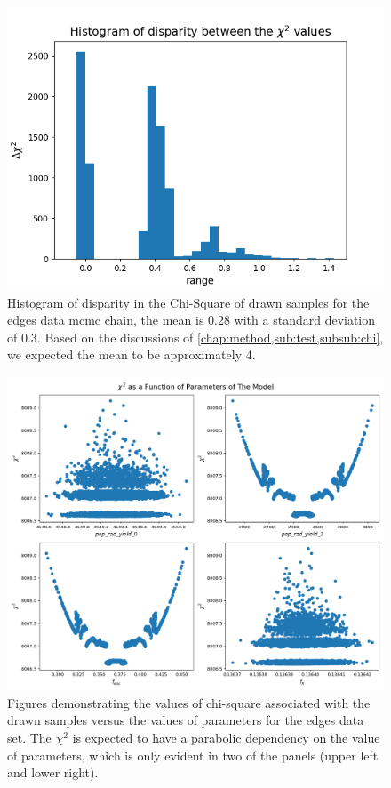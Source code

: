\documentclass[12pt, TexShade, letterpaper]{report}
\begin{document}
\begin{figure}[h!]
\centering
\includegraphics[scale =0.7]{csq_hist_edges.png}
\caption[Histogram of disparity in the Chi-Square of drawn samples for the \gls{EDGES} data \gls{mcmc} chain]{Histogram of disparity in the Chi-Square of drawn samples for the \gls{edges} data \gls{mcmc} chain, the mean is 0.28 with a standard deviation of 0.3. Based on the discussions of \ref{chap:method,sub:test,subsub:chi}, we expected the mean to be approximately 4.}
\label{fig:csq_hist_edges}
\end{figure}


\begin{figure}[h!]
\centering
\includegraphics[scale =0.5]{csq_vs_params_edges.png}
\caption[Chi-Square of Drawn samples as a function of parameter values for \gls{edges} data]{Figures demonstrating the values of chi-square associated with the drawn samples versus the values of parameters for the \gls{edges} data set. The $\chi^2$ is expected to have a parabolic dependency on the value of parameters, which is only evident in two of the panels (upper left and lower right).}
\label{fig:csq_vs_params_edges}
\end{figure}
\end{document}
